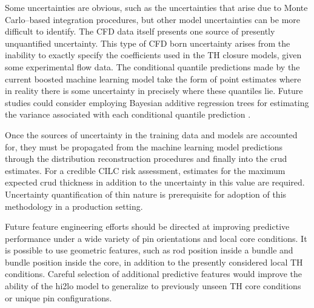 Some uncertainties are obvious, such as the uncertainties that arise due to Monte Carlo--based integration procedures, but other model uncertainties can be more difficult to identify.  The CFD data itself presents one source of presently unquantified uncertainty.  This type of CFD born uncertainty arises from the inability to exactly specify the coefficients used in the TH closure models, given some experimental flow data.  The conditional quantile predictions made by the current boosted machine learning model take the form of point estimates where in reality there is some uncertainty in precisely where these quantiles lie.  Future studies could consider employing Bayesian additive regression trees for estimating the variance associated with each conditional quantile prediction \cite{chipman2010}.


Once the sources of uncertainty in the training data and models are accounted for, they must be propagated from the machine learning model predictions through the distribution reconstruction procedures and finally into the crud estimates.  For a credible CILC risk assessment, estimates for the maximum expected crud thickness in addition to the uncertainty in this value are required. Uncertainty quantification of thin nature is prerequisite for adoption of this methodology in a production setting.

Future feature engineering efforts should be directed at improving predictive performance under a wide variety of pin orientations and local core conditions.  It is possible to use geometric features, such as rod position inside a bundle and bundle position inside the core, in addition to the presently considered local TH conditions.  Careful selection of additional predictive features would improve the ability of the hi2lo model to generalize to previously unseen TH core conditions or unique pin configurations.


